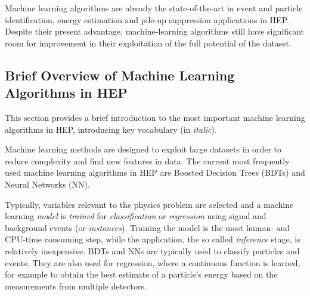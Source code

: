 
Machine learning algorithms are already the state-of-the-art in event and particle identification, energy estimation and pile-up suppression applications in HEP. Despite their present advantage, machine-learning algorithms still have significant room for improvement in their exploitation of the full potential of the dataset.


\subsection{Brief Overview of Machine Learning Algorithms in HEP}

This section provides a brief introduction to the most important machine learning algorithms in HEP, introducing key vocabulary (in \textit{italic}).


Machine learning methods are designed to exploit large datasets in order to reduce complexity and find new features in data. The current most frequently used machine learning algorithms in HEP are Boosted Decision Trees (BDTs) and Neural Networks (NN).

Typically, variables relevant to the physics problem are selected and a machine learning \textit{model} is \textit{trained} for \textit{classification} or \textit{regression} using signal and background events (or \textit{instances}).
Training the model is the most human- and CPU-time consuming step, while the application, the so called \textit{inference} stage, is relatively inexpensive.
BDTs and NNs are typically used to classify particles and events.
They are also used for regression, where a continuous function is learned, for example to obtain the best estimate of a particle's energy based on the measurements from multiple detectors.

